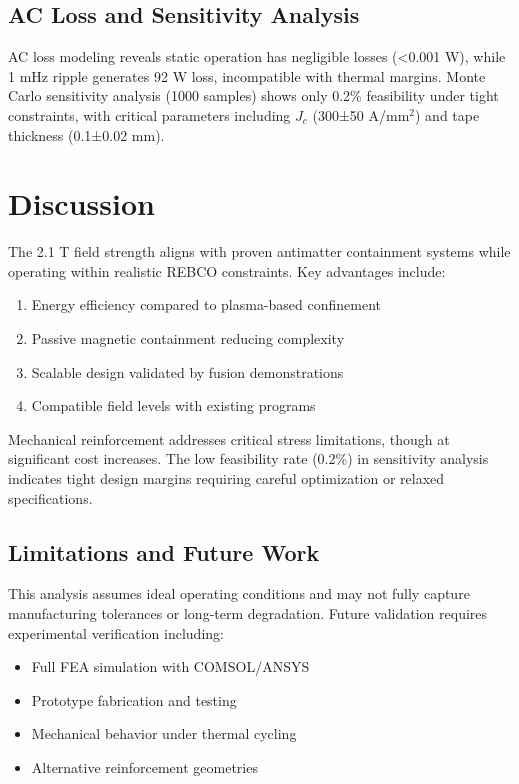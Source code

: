 \documentclass[10pt,twocolumn]{article}
\begin{document}
\subsection{AC Loss and Sensitivity Analysis}

AC loss modeling reveals static operation has negligible losses (<0.001 W), while 1 mHz ripple generates 92 W loss, incompatible with thermal margins. Monte Carlo sensitivity analysis (1000 samples) shows only 0.2\% feasibility under tight constraints, with critical parameters including $J_c$ (300±50 A/mm$^2$) and tape thickness (0.1±0.02 mm).

\section{Discussion}

The 2.1 T field strength aligns with proven antimatter containment systems while operating within realistic REBCO constraints. Key advantages include:
\begin{enumerate}
\item Energy efficiency compared to plasma-based confinement
\item Passive magnetic containment reducing complexity
\item Scalable design validated by fusion demonstrations \cite{sparc2020}
\item Compatible field levels with existing programs \cite{alpha2023}
\end{enumerate}

Mechanical reinforcement addresses critical stress limitations, though at significant cost increases. The low feasibility rate (0.2\%) in sensitivity analysis indicates tight design margins requiring careful optimization or relaxed specifications.

\subsection{Limitations and Future Work}

This analysis assumes ideal operating conditions and may not fully capture manufacturing tolerances or long-term degradation. Future validation requires experimental verification including:
\begin{itemize}
\item Full FEA simulation with COMSOL/ANSYS
\item Prototype fabrication and testing
\item Mechanical behavior under thermal cycling
\item Alternative reinforcement geometries
\end{itemize}
\end{document}
